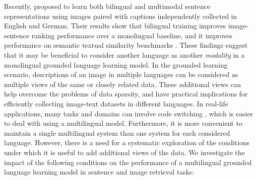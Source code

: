 Recently, \cite{gella2017image} proposed to learn both bilingual and multimodal sentence representations using images paired with captions independently collected in English and German. Their results show that bilingual training improves image-sentence ranking performance over a monolingual baseline, and it improves performance on semantic textual similarity benchmarks \cite{agirre2014semeval,agirre2015semeval}. These findings suggest that it may be beneficial to consider another language as another {\it modality} in a monolingual grounded language learning model. In the grounded learning scenario, descriptions of an image in multiple languages can be considered as multiple views of the same or closely related data. These additional views can help overcome the problems of data sparsity, and have practical implications for efficiently collecting image-text datasets in different languages. In real-life applications, many tasks and domains can involve code switching \citep{barman2014code}, which is easier to deal with using a multilingual model. Furthermore, it is more convenient to maintain a single multilingual system than one system for each considered language. However, there is a need for a systematic exploration of the
conditions under which it is useful to add additional views of the data. We investigate the impact of the following conditions on the performance of a multilingual grounded language learning model in sentence and image retrieval tasks:
%
